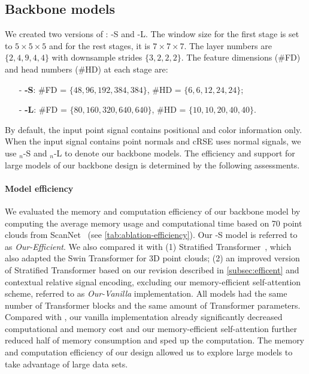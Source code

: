\documentclass[10pt,twocolumn,letterpaper]{article}
\begin{document}
\subsection{Backbone models} \label{subsec:backbonemodel}
We created two versions of {\SST}: {\SST}-S and {\SST}-L. The window size for the first stage is set to $5\times 5 \times 5$ and for the rest stages, it is $7\times 7 \times 7$. The layer numbers are $\{2, 4, 9, 4, 4\}$ with downsample strides $\{3, 2, 2, 2\}$. The feature dimensions (\#FD) and head numbers (\#HD) at each stage are:
\begin{enumerate}[leftmargin=*]\item[-]\textbf{{\SST}-S}:  \#FD = $\{48,96,192,384,384\}$, \#HD = $\{6, 6, 12, 24, 24\}$;
    \item[-]\textbf{{\SST}-L}:  \#FD = $\{80,160,320,640,640\}$, \#HD = $\{10, 10, 20, 40, 40\}$.
\end{enumerate}
By default, the input point signal contains positional and color information only. When the input signal contains point normals and cRSE uses normal signals, we use {\SST}$_n$-S and {\SST}$_n$-L to denote our backbone models.
The efficiency and support for large models of our backbone design is determined by the following assessments.

\paragraph{Model efficiency}
We evaluated the memory and computation efficiency of our backbone model by computing the average memory usage and computational time based on 70 point clouds from ScanNet~\cite{dai2017scannet} (see \cref{tab:ablation-efficiency}). Our {\SST}-S model is referred to as \emph{Our-Efficient}. We also compared it with (1) Stratified Transformer~\cite{lai2022stratified}, which also adapted the Swin Transformer for 3D point clouds; (2) an improved version of Stratified Transformer based on our revision described in \cref{subsec:efficent} and contextual relative signal encoding, excluding our memory-efficient self-attention scheme, referred to as \emph{Our-Vanilla} implementation. All models had the same number of Transformer blocks and the same amount of Transformer parameters. Compared with \cite{lai2022stratified}, our vanilla implementation already significantly decreased computational and memory cost and our memory-efficient self-attention further reduced half of memory consumption and sped up the computation. The memory and computation efficiency of our design allowed us to explore large {\SST} models to take advantage of large data sets.
\end{document}
